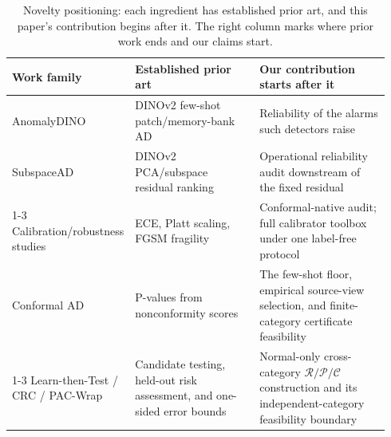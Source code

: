 \begin{table}[pos=t]
\centering
\caption{Novelty positioning: each ingredient has established prior art, and this paper's contribution begins after it. The right column marks where prior work ends and our claims start.}
\label{tab:prior-positioning}
\footnotesize
\setlength{\tabcolsep}{3pt}
\begin{tabular}{p{0.24\linewidth}p{0.34\linewidth}p{0.36\linewidth}}
\toprule
Work family & Established prior art & Our contribution starts after it \\
\midrule
AnomalyDINO & DINOv2 few-shot patch/memory-bank AD & Reliability of the alarms such detectors raise \\
SubspaceAD & DINOv2 PCA/subspace residual ranking & Operational reliability audit downstream of the fixed residual \\
\cmidrule(lr){1-3}
Calibration/robustness studies & ECE, Platt scaling, FGSM fragility & Conformal-native audit; full calibrator toolbox under one label-free protocol \\
Conformal AD & P-values from nonconformity scores & The few-shot floor, empirical source-view selection, and finite-category certificate feasibility \\
\cmidrule(lr){1-3}
Learn-then-Test / CRC / PAC-Wrap & Candidate testing, held-out risk assessment, and one-sided error bounds & Normal-only cross-category $\mathcal R/\mathcal P/\mathcal C$ construction and its independent-category feasibility boundary \\
\bottomrule
\end{tabular}
\end{table}
